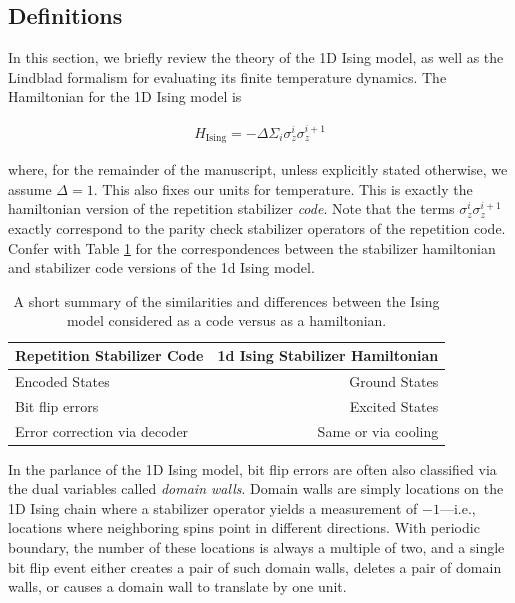 \documentclass[twocolumn,superscriptaddress,aps,prb,floatfix]{revtex4-1}
\newcommand{\Hising}{H_{\mathrm{Ising}}}
\begin{document}
\subsection{Definitions}
\label{sec:Defs}
In this section, we briefly review the theory of the 1D Ising model, as well as the Lindblad formalism for evaluating its finite temperature dynamics.  The Hamiltonian for the 1D Ising model is

\begin{align}
\Hising = -\Delta \Sigma_i \sigma^i_z \sigma^{i+1}_z
\label{eq:isingham}
\end{align}

where, for the remainder of the manuscript, unless explicitly stated otherwise, we assume $\Delta=1$.  This also fixes our units for temperature.  This is exactly the hamiltonian version of the repetition stabilizer \emph{code}\cite{Freeman2016}.  Note that the terms $\sigma^i_z \sigma^{i+1}_z$ exactly correspond to the parity check stabilizer operators of the repetition code.  Confer with Table \ref{tab:code_vs_hamiltonian} for the correspondences between the stabilizer hamiltonian and stabilizer code versions of the 1d Ising model.

\begin{table}
\begin{center}
  \begin{tabular}{ l | r }
    \hline
    Repetition Stabilizer Code & 1d Ising Stabilizer Hamiltonian \\ \hline
    Encoded States & Ground States \\ \hline
    Bit flip errors & Excited States \\ \hline
    Error correction via decoder & Same or via cooling \\ \hline
    \hline
  \end{tabular}
\end{center}
\caption{A short summary of the similarities and differences between the Ising model considered as a code versus as a hamiltonian.}
\label{tab:code_vs_hamiltonian}
\end{table}

In the parlance of the 1D Ising model, bit flip errors are often also classified via the dual variables called \emph{domain walls}.  Domain walls are simply locations on the 1D Ising chain where a stabilizer operator yields a measurement of $-1$---i.e., locations where neighboring spins point in different directions.  With periodic boundary, the number of these locations is always a multiple of two, and a single bit flip event either creates a pair of such domain walls, deletes a pair of domain walls, or causes a domain wall to translate by one unit.  
\end{document}
